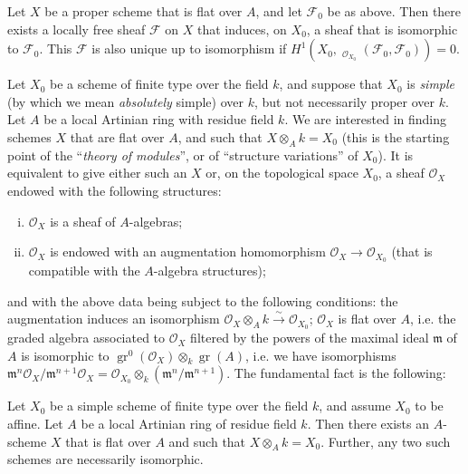 \documentclass{article}
\theoremstyle{plain}
\newenvironment{theorem}[1]
  {\renewcommand\theinnercustomtheorem{#1}\innercustomtheorem}
  {\endinnercustomtheorem}
\newenvironment{corollary}[1]
  {\renewcommand\theinnercustomcorollary{#1}\innercustomcorollary}
  {\endinnercustomcorollary}
\theoremstyle{definition}
\newcommand{\sh}[1]{{\mathscr{#1}}}
\newcommand{\fk}{\mathfrak}
\DeclareMathOperator{\Hom}{Hom}
\DeclareMathOperator{\shHom}{\underline{\Hom}}
\DeclareMathOperator{\gr}{gr}
\newcommand{\oldpage}[1]{\marginpar{\footnotesize$\Big\vert$ \textit{p.~#1}}}
\begin{document}
\begin{corollary}{1}
\label{proposition3corollary1}
  Let $X$ be a proper scheme that is flat over $A$, and let $\sh{F}_0$ be as above.
  Then there exists a locally free sheaf $\sh{F}$ on $X$ that induces, on $X_0$, a sheaf that is isomorphic to $\sh{F}_0$.
  This $\sh{F}$ is also unique up to isomorphism if $H^1(X_0,\shHom_{\sh{O}_{X_0}}(\sh{F}_0,\sh{F}_0))=0$.
\end{corollary}

Let $X_0$ be a scheme of finite type over the field $k$, and suppose that $X_0$ is \emph{simple} (by which we mean \emph{absolutely} simple) over $k$, but not necessarily proper over $k$.
Let $A$ be a local Artinian ring with residue field $k$.
We are interested in finding schemes $X$ that are flat over $A$, and such that $X\otimes_A k=X_0$ (this is the starting point of the ``\emph{theory of modules}'', or of ``structure variations''
\oldpage{182-12}
of $X_0$).
It is equivalent to give either such an $X$ or, on the topological space $X_0$, a sheaf $\sh{O}_X$ endowed with the following structures:
\begin{enumerate}[i.]
  \item $\sh{O}_X$ is a sheaf of $A$-algebras;
  \item $\sh{O}_X$ is endowed with an augmentation homomorphism $\sh{O}_X\to\sh{O}_{X_0}$ (that is compatible with the $A$-algebra structures);
\end{enumerate}
and with the above data being subject to the following conditions: the augmentation induces an isomorphism $\sh{O}_X\otimes_A k\xrightarrow{\sim}\sh{O}_{X_0}$;
$\sh{O}_X$ is flat over $A$, i.e. the graded algebra associated to $\sh{O}_X$ filtered by the powers of the maximal ideal $\fk{m}$ of $A$ is isomorphic to $\gr^0(\sh{O}_X)\otimes_k\gr(A)$, i.e. we have isomorphisms $\fk{m}^n\sh{O}_X/\fk{m}^{n+1}\sh{O}_X = \sh{O}_{X_0}\otimes_k(\fk{m}^n/\fk{m}^{n+1})$.
The fundamental fact is the following:

\begin{theorem}{8}
\label{theorem8}
  Let $X_0$ be a simple scheme of finite type over the field $k$, and assume $X_0$ to be affine.
  Let $A$ be a local Artinian ring of residue field $k$.
  Then there exists an $A$-scheme $X$ that is flat over $A$ and such that $X\otimes_A k=X_0$.
  Further, any two such schemes are necessarily isomorphic.
\end{theorem}
\end{document}
